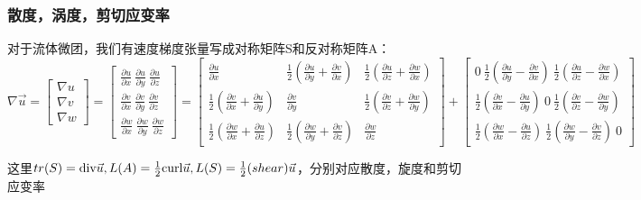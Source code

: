 \documentclass{article}
\begin{document}
\subsubsection{散度，涡度，剪切应变率}

对于流体微团，我们有速度梯度张量写成对称矩阵S和反对称矩阵A：
$$\nabla\vec{u} = \begin{bmatrix}
\nabla u\\
\nabla v\\
\nabla w
\end{bmatrix}  = \begin{bmatrix}
\frac{\partial u}{\partial x}\ \frac{\partial u}{\partial y}\ \frac{\partial u}{\partial z} \\
\frac{\partial v}{\partial x}\ \frac{\partial v}{\partial y}\ \frac{\partial v}{\partial z} \\
\frac{\partial w}{\partial x}\ \frac{\partial w}{\partial y}\ \frac{\partial w}{\partial z}
\end{bmatrix}  = \begin{bmatrix}
\frac{\partial u}{\partial x}&
\frac{1}{2}(\frac{\partial u}{\partial y}+\frac{\partial v}{\partial x})&
\frac{1}{2}(\frac{\partial u}{\partial z}+\frac{\partial w}{\partial x})\\
\frac{1}{2}(\frac{\partial v}{\partial x}+\frac{\partial u}{\partial y})&
\frac{\partial v}{\partial y}&
\frac{1}{2}(\frac{\partial v}{\partial z}+\frac{\partial w}{\partial y}) \\
\frac{1}{2}(\frac{\partial w}{\partial x}+\frac{\partial u}{\partial z})&
\frac{1}{2}(\frac{\partial w}{\partial y}+\frac{\partial v}{\partial z})&
\frac{\partial w}{\partial z}
\end{bmatrix}+\begin{bmatrix}
0\ 
\frac{1}{2}(\frac{\partial u}{\partial y}-\frac{\partial v}{\partial x})\ 
\frac{1}{2}(\frac{\partial u}{\partial z}-\frac{\partial w}{\partial x})\\
\frac{1}{2}(\frac{\partial v}{\partial x}-\frac{\partial u}{\partial y})\
0\
\frac{1}{2}(\frac{\partial v}{\partial z}-\frac{\partial w}{\partial y}) \\
\frac{1}{2}(\frac{\partial w}{\partial x}-\frac{\partial u}{\partial z})\
\frac{1}{2}(\frac{\partial w}{\partial y}-\frac{\partial v}{\partial z})\
0
\end{bmatrix} $$

这里$tr(S) = \text{div}\vec{u}, L(A) = \frac{1}{2}\text{curl}\vec{u}, L(S)=\frac{1}{2}\text(shear)\vec{u}$，分别对应散度，旋度和剪切应变率
\end{document}
